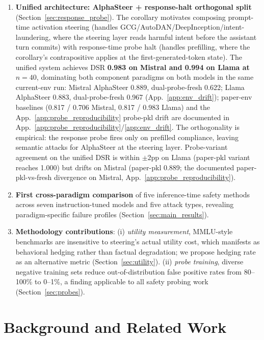 \documentclass{article}
\begin{document}
\begin{enumerate}
    \item \textbf{Unified architecture: AlphaSteer + response-halt orthogonal split} (Section~\ref{sec:response_probe}). The corollary motivates composing prompt-time activation steering (handles GCG/AutoDAN/DeepInception/intent-laundering, where the steering layer reads harmful intent before the assistant turn commits) with response-time probe halt (handles prefilling, where the corollary's contrapositive applies at the first-generated-token state). The unified system achieves DSR \textbf{0.983 on Mistral and 0.994 on Llama at $n=40$}, dominating both component paradigms on both models in the same current-env run: Mistral AlphaSteer 0.889, dual-probe-fresh 0.622; Llama AlphaSteer 0.883, dual-probe-fresh 0.967 (App.~\ref{app:env_drift}); paper-env baselines (0.817 / 0.706 Mistral, 0.817 / 0.983 Llama) and the App.~\ref{app:probe_reproducibility} probe-pkl drift are documented in App.~\ref{app:probe_reproducibility}/\ref{app:env_drift}. The orthogonality is empirical: the response probe fires only on prefilled compliance, leaving semantic attacks for AlphaSteer at the steering layer. Probe-variant agreement on the unified DSR is within $\pm 2$pp on Llama (paper-pkl variant reaches 1.000) but drifts on Mistral (paper-pkl 0.889; the documented paper-pkl-vs-fresh divergence on Mistral, App.~\ref{app:probe_reproducibility}).
    \item \textbf{First cross-paradigm comparison} of five inference-time safety methods across seven instruction-tuned models and five attack types, revealing paradigm-specific failure profiles (Section~\ref{sec:main_results}).
    \item \textbf{Methodology contributions}: (i) \emph{utility measurement}, MMLU-style benchmarks are insensitive to steering's actual utility cost, which manifests as behavioral hedging rather than factual degradation; we propose hedging rate as an alternative metric (Section~\ref{sec:utility}). (ii) \emph{probe training}, diverse negative training sets reduce out-of-distribution false positive rates from 80--100\% to 0--1\%, a finding applicable to all safety probing work (Section~\ref{sec:probes}).
\end{enumerate}

\section{Background and Related Work}
\label{sec:related}
\end{document}
